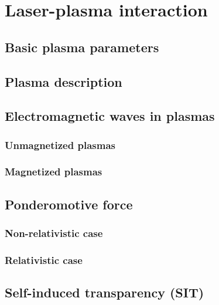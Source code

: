\documentclass[12pt, twoside, a4paper, openright]{report}
\begin{document}

\chapter{Laser-plasma interaction}


\section{Basic plasma parameters}


\section{Plasma description}


\section{Electromagnetic waves in plasmas}


\subsection{Unmagnetized plasmas}


\subsection{Magnetized plasmas}


\section{Ponderomotive force}


\subsection{Non-relativistic case}


\subsection{Relativistic case}


\section{Self-induced transparency (SIT)}

\end{document}
